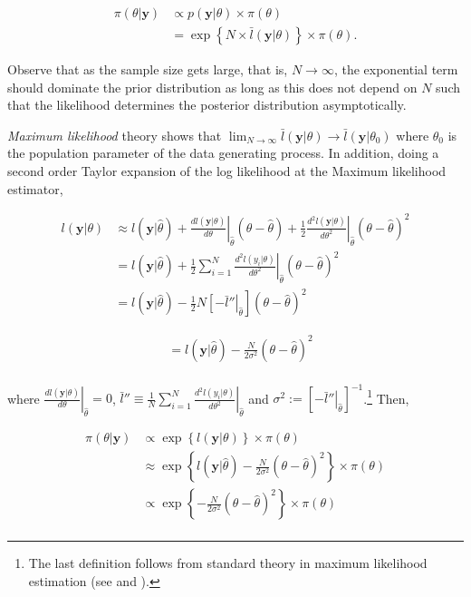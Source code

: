 \begin{align}
	\pi(\theta|\mathbf{y})&\propto p(\mathbf{y}|\theta) \times \pi(\theta)\nonumber\\
	&=\exp\left\{N\times \bar{l}(\mathbf{y}|\theta)\right\} \times \pi(\theta).
\end{align}

Observe that as the sample size gets large, that is, $N\rightarrow \infty$, the exponential term should dominate the prior distribution as long as this does not depend on $N$ such that the likelihood determines the posterior distribution asymptotically.

\textit{Maximum likelihood} theory shows that $\lim_{N\to\infty} \bar{l}(\mathbf{y}|\theta)\rightarrow \bar{l}(\mathbf{y}|\theta_0)$ where $\theta_0$ is the population parameter of the data generating process. In addition, doing a second order Taylor expansion of the log likelihood at the Maximum likelihood estimator,

\begin{align*}
	l(\mathbf{y}|\theta)&\approx l(\mathbf{y}|\hat{\theta})+\left.\frac{dl(\mathbf{y}|{\theta})}{d\theta}\right\vert_{\hat{\theta}}(\theta-\hat{\theta})+\frac{1}{2}\left.\frac{d^2l(\mathbf{y}|{\theta})}{d\theta^2}\right\vert_{\hat{\theta}}(\theta-\hat{\theta})^2\\
	&= l(\mathbf{y}|\hat{\theta})+\frac{1}{2}\left.\sum_{i=1}^N\frac{d^2l(y_i|{\theta})}{d\theta^2}\right\vert_{\hat{\theta}}(\theta-\hat{\theta})^2\\
	&= l(\mathbf{y}|\hat{\theta})-\frac{1}{2}\left.N\left[-\bar{l}''\right\vert_{\hat{\theta}}\right](\theta-\hat{\theta})^2 
\end{align*}

\begin{align*}
	&= l(\mathbf{y}|\hat{\theta})-\frac{N}{2\sigma^2}(\theta-\hat{\theta})^2\\ 
\end{align*}

where $\left.\frac{dl(\mathbf{y}|\theta)}{d\theta}\right\vert_{\hat{\theta}}=0$, $\bar{l}''\equiv\frac{1}{N}\left.\sum_{i=1}^N\frac{d^2l(y_i|{\theta})}{d\theta^2}\right\vert_{\hat{\theta}}$ and $\sigma^2:=\left[\left.-\bar{l}''\right\vert_{\hat{\theta}}\right]^{-1}$.\footnote{The last definition follows from standard theory in maximum likelihood estimation (see \cite[Chap. ~10]{casella2024statistical} and \cite[Chap. ~13]{wooldridge2010econometric}).} Then,

\begin{align*}
	\pi(\theta|\mathbf{y})&\propto \exp\left\{{l}(\mathbf{y}|\theta)\right\} \times \pi(\theta)\\
	&\approx \exp\left\{l(\mathbf{y}|\hat{\theta})-\frac{N}{2\sigma^2}(\theta-\hat{\theta})^2\right\} \times \pi(\theta)\\
	&\propto \exp\left\{-\frac{N}{2\sigma^2}(\theta-\hat{\theta})^2\right\} \times \pi(\theta)\\ 
\end{align*}

